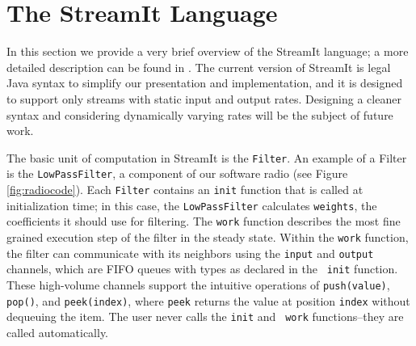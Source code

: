 
\section{The StreamIt Language}
\label{sec:streamit}

In this section we provide a very brief overview of the StreamIt
language; a more detailed description can be found in
\cite{streamitcc}.  The current version of StreamIt is legal Java
syntax to simplify our presentation and implementation, and it is
designed to support only streams with static input and output rates.
Designing a cleaner syntax and considering dynamically varying rates
will be the subject of future work.

The basic unit of computation in StreamIt is the {\tt Filter}.  An
example of a Filter is the {\tt LowPassFilter}, a component of our
software radio (see Figure \ref{fig:radiocode}).  Each {\tt Filter}
contains an {\tt init} function that is called at initialization time;
in this case, the {\tt LowPassFilter} calculates {\tt weights}, the
coefficients it should use for filtering.  The {\tt work} function
describes the most fine grained execution step of the filter in the
steady state.  Within the {\tt work} function, the filter can
communicate with its neighbors using the {\tt input} and {\tt output}
channels, which are FIFO queues with types as declared in the {\tt
init} function.  These high-volume channels support the intuitive
operations of {\tt push(value)}, {\tt pop()}, and {\tt peek(index)},
where {\tt peek} returns the value at position {\tt index} without
dequeuing the item.  The user never calls the {\tt init} and {\tt
work} functions--they are called automatically.


